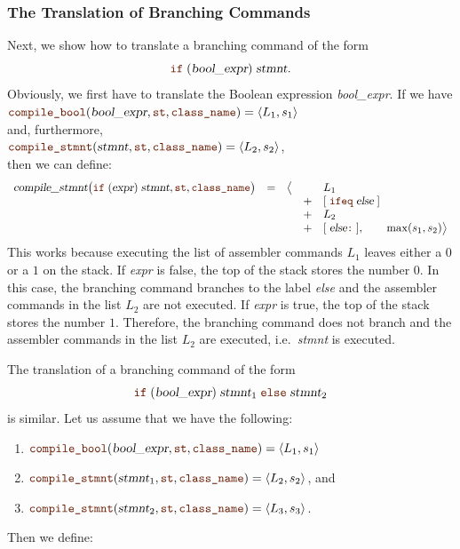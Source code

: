 \subsubsection{The Translation of Branching Commands}
Next, we show how to translate a branching command of the form
\[ \mytt{if}\; (\textsl{bool\_expr})\; \textsl{stmnt}. \]
Obviously, we first have to translate the Boolean expression \textsl{bool\_expr}.
If we have
\\[0.2cm]
\hspace*{1.3cm}
$\mytt{compile\_bool}(\textsl{bool\_expr}, \mytt{st}, \mytt{class\_name}) = \pair(L_1, s_1)$
\\[0.2cm]
and, furthermore, 
\\[0.2cm]
\hspace*{1.3cm}
$\mytt{compile\_stmnt}(\textsl{stmnt}, \mytt{st}, \mytt{class\_name}) = \pair(L_2, s_2)$,
\\[0.2cm]
then we can define:
\[
   \begin{array}[t]{lcccl}
   \textsl{compile\_stmnt}\bigl(\mytt{if}\; (\textsl{expr})\;\textsl{stmnt}, \mytt{st}, \mytt{class\_name}\bigr) & = & \bigl\langle & & L_1  \\
   &&& + & [\;\mytt{ifeq}\;\textsl{else}\;] \\
   &&& + & L_2 \\
   &&& + & [\;\textsl{else}\mytt{:}\;], \qquad \max(s_1, s_2) \bigr\rangle        
\end{array}
\]
This works because executing the list of assembler commands $L_1$ leaves either a $0$ or a $1$ on the stack.
If \textsl{expr} is false, the top of the stack stores the number $0$.  In this case, the branching command
 branches to the label \textsl{else} and the assembler commands in the list $L_2$ are not
executed.  If \textsl{expr} is true, the top of the stack stores the number $1$.  Therefore, the branching
command  does not branch and the assembler commands in the list $L_2$ are executed,
i.e.~\textsl{stmnt} is executed.

The translation of a branching command of the form
\[ \mytt{if}\; (\textsl{bool\_expr})\; \textsl{stmnt}_1\; \mytt{else}\; \textsl{stmnt}_2 \]
is similar.  Let us assume that we have the following:
\begin{enumerate}
\item $\mytt{compile\_bool}(\textsl{bool\_expr}, \mytt{st}, \mytt{class\_name}) = \pair(L_1, s_1)$
\item $\mytt{compile\_stmnt}(\textsl{stmnt}_1, \mytt{st}, \mytt{class\_name}) = \pair(L_2, s_2)$, and
\item $\mytt{compile\_stmnt}(\textsl{stmnt}_2, \mytt{st}, \mytt{class\_name}) = \pair(L_3, s_3)$.
\end{enumerate}
Then we define:
\pagebreak

